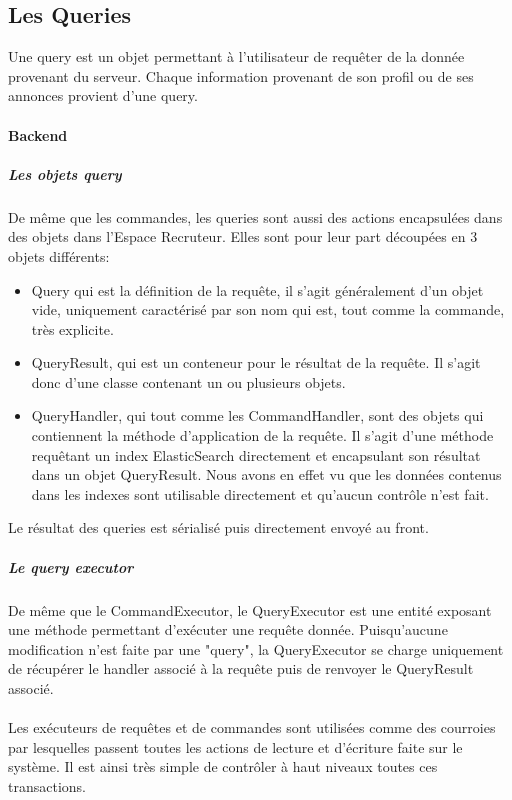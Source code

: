 \subsection{Les Queries}
\label{sub:Les Queries}
Une query est un objet permettant à l'utilisateur de requêter de la donnée provenant du serveur.
Chaque information provenant de son profil ou de ses annonces provient d'une query.
\paragraph{Backend}
\label{par:Backend}
\subparagraph{Les objets query}
\label{subp:Les objets query}
De même que les commandes, les queries sont aussi des actions encapsulées dans des objets dans l'Espace Recruteur.
Elles sont pour leur part découpées en 3 objets différents:
\begin{itemize}
  \item Query qui est la définition de la requête, il s'agit généralement d'un objet vide, uniquement caractérisé par son nom qui est, tout comme la commande, très explicite.
  \item QueryResult, qui est un conteneur pour le résultat de la requête.
  Il s'agit donc d'une classe contenant un ou plusieurs objets.
  \item QueryHandler, qui tout comme les CommandHandler, sont des objets qui contiennent la méthode d'application de la requête.
  Il s'agit d'une méthode requêtant un index ElasticSearch directement et encapsulant son résultat dans un objet QueryResult.
  Nous avons en effet vu que les données contenus dans les indexes sont utilisable directement et qu'aucun contrôle n'est fait.
\end{itemize}
Le résultat des queries est sérialisé puis directement envoyé au front.
\subparagraph{Le query executor}
De même que le CommandExecutor, le QueryExecutor est une entité exposant une méthode permettant d'exécuter une requête donnée.
Puisqu'aucune modification n'est faite par une "query", la QueryExecutor se charge uniquement de récupérer le handler associé à la requête puis de renvoyer le QueryResult associé.

\paragraph{}
Les exécuteurs de requêtes et de commandes sont utilisées comme des courroies par lesquelles passent toutes les actions de lecture et d'écriture faite sur le système.
Il est ainsi très simple de contrôler à haut niveaux toutes ces transactions.

